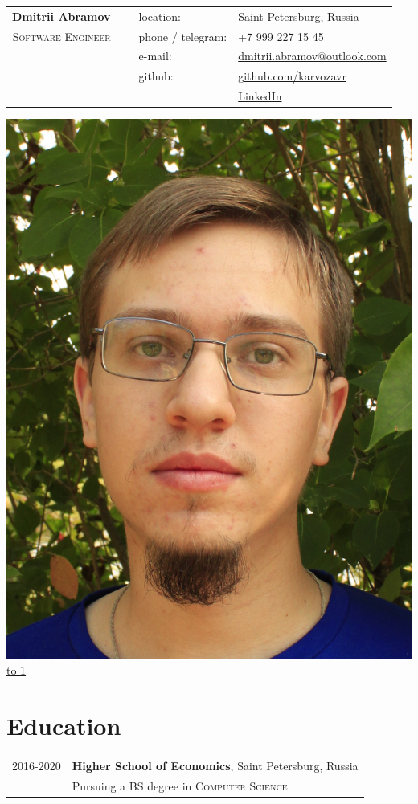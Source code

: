\documentclass[10pt]{article}
\def\LINE{\vspace*{-1em}\noindent \underline{\hbox to 1\textwidth{{ } \hfil{ } \hfil{ } }}}
\begin{document}

\begin{tabular}{rlll}
       {\bf \huge Dmitrii Abramov} &  \  & location: &Saint Petersburg, Russia\\ 
    \textsc{\color{accent} Software Engineer} & \ & phone / telegram:   & +7 999 227 15 45\\
    & \ & e-mail:             & \href{mailto:dmitrii.abramov@outlook.com}{dmitrii.abramov@outlook.com}\\
    & \ & github:             & \href{https://github.com/karvozavr}{github.com/karvozavr}\\
   & \ &   \                 & \href{https://www.linkedin.com/in/dmitriy-abramov/}{LinkedIn}  
\end{tabular}
 \includegraphics[align=c, scale=0.05]{me.png} 
 \\
\LINE

\section*{\color{accent} Education}
\begin{tabular}{rl}
 \textsc{2016-2020} & \textbf{Higher School of Economics}, Saint Petersburg, Russia\\
 \  & Pursuing a BS degree in \textsc{Computer Science}
\end{tabular}
\end{document}
